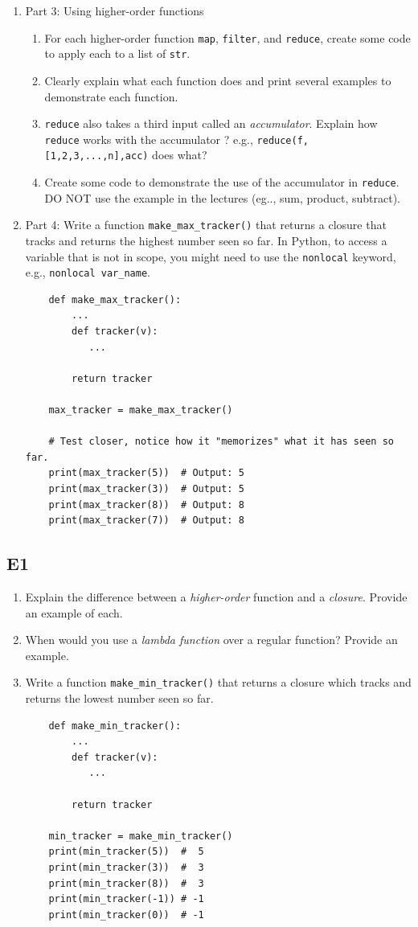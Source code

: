 \documentclass[oneside,11pt,dvipsnames]{book}
\newcommand{\code}[1]{\texttt{#1}}
\begin{document}
\begin{enumerate}
\item Part 3: Using higher-order functions
\begin{enumerate}
\item For each higher-order function \code{map}, \code{filter}, and \code{reduce}, create some code to apply each to a list of \code{str}.
\item Clearly explain what each function does and print several examples to demonstrate each function.
\item \code{reduce} also takes a third input called an \emph{accumulator}.  Explain how \code{reduce} works with the accumulator ? e.g., \code{reduce(f,[1,2,3,...,n],acc)} does what?
\item Create some code to demonstrate the use of the accumulator in \code{reduce}. DO NOT use the example in the lectures (eg.., sum, product, subtract).
\end{enumerate}

\item Part 4: Write a function \code{make\_max\_tracker()} that returns a closure that tracks and returns the highest number seen so far. In Python, to access a variable that is not in scope, you might need to use the \code{nonlocal} keyword, e.g., \code{nonlocal var\_name}.
\begin{lstlisting}
    def make_max_tracker():
        ...
        def tracker(v):
           ...
        
        return tracker

    max_tracker = make_max_tracker()

    # Test closer, notice how it "memorizes" what it has seen so far.
    print(max_tracker(5))  # Output: 5
    print(max_tracker(3))  # Output: 5
    print(max_tracker(8))  # Output: 8
    print(max_tracker(7))  # Output: 8
\end{lstlisting} 

\end{enumerate}

\subsection{E1}\label{exercise:e1}
\begin{enumerate}
    \item Explain the difference between a \emph{higher-order} function and a \emph{closure}. Provide an example of each.
    \item When would you use a \emph{lambda function} over a regular function? Provide an example.
    \item Write a function \code{make\_min\_tracker()} that returns a closure which tracks and returns the lowest number seen so far.
    \begin{lstlisting}
    def make_min_tracker():
        ...
        def tracker(v):
           ...
        
        return tracker

    min_tracker = make_min_tracker()
    print(min_tracker(5))  #  5
    print(min_tracker(3))  #  3
    print(min_tracker(8))  #  3
    print(min_tracker(-1)) # -1
    print(min_tracker(0))  # -1
    \end{lstlisting}
\end{enumerate}
\end{document}
